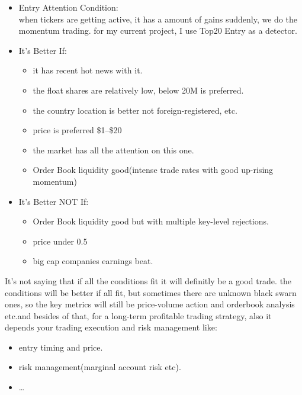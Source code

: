\documentclass[a4paper, 11pt]{article}
\begin{document}
\begin{itemize}

\item Entry Attention Condition:\\
when tickers are getting active, it has a amount of gains suddenly, we do the momentum trading.
for my current project, I use Top20 Entry as a detector.

\item It's Better If:
\begin{itemize}
    \item it has recent hot news with it.
    \item the float shares are relatively low, below 20M is preferred.
    \item the country location is better not foreign-registered, etc.
    \item price is preferred \$1--\$20
    \item the market has all the attention on this one.
    \item Order Book liquidity good(intense trade rates with good up-rising momentum)
\end{itemize}

\item It's Better NOT If:
\begin{itemize}
    \item Order Book liquidity good but with multiple key-level rejections.
    \item price under 0.5
    \item big cap companies earnings beat.
\end{itemize}

\end{itemize}

It's not saying that if all the conditions fit it will definitly be a good trade.
the conditions will be better if all fit, but sometimes there are unknown black swarn ones, so
the key metrics will still be price-volume action and orderbook analysis etc.and besides of that,
for a long-term profitable trading strategy, also it depends your trading execution and risk management like:

\begin{itemize}
    \item entry timing and price.
    \item risk management(marginal account risk etc).
    \item \ldots
\end{itemize}
\end{document}

